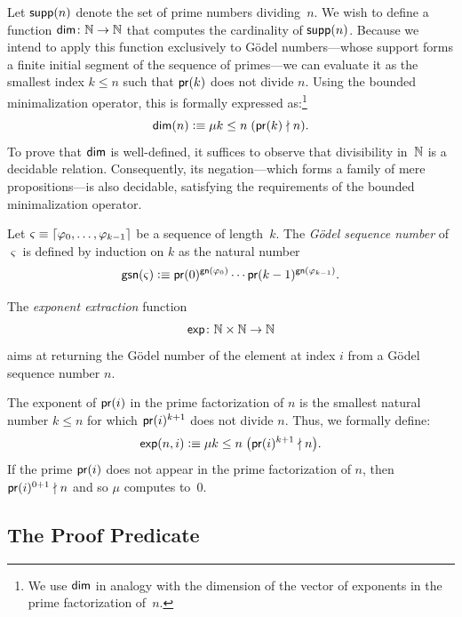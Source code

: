 \begin{defns}
\begin{description}[font=\normalfont\scshape]
        \item[Sequence Dimension:]
        Let $\mathsf{supp}(n)$ denote the set of prime numbers dividing~$n$. We wish to define a function $\fun{dim}\colon\N\to\N$ that computes the cardinality of $\mathsf{supp}(n)$. Because we intend to apply this function exclusively to Gödel numbers---whose support forms a finite initial segment of the sequence of primes---we can evaluate it as the smallest index $k\le n$ such that $\mathsf{pr}(k)$ does not divide $n$. Using the bounded minimalization operator, this is formally expressed as:\footnote{We use $\mathsf{dim}$ in analogy with the dimension of the vector of exponents in the prime factorization of~$n$.}
        \[
            \mathsf{dim}(n)\mathrel{\vcentcolon}\equiv\mu k\le n\;(\mathsf{pr}(k)\nmid n).
        \]
        To prove that $\mathsf{dim}$ is well-defined, it suffices to observe that divisibility in~$\mathbb{N}$ is a decidable relation. Consequently, its negation---which forms a family of mere propositions---is also decidable, satisfying the requirements of the bounded minimalization operator.
        
        \item[Gödel Sequence Number] Let $\varsigma\equiv{\lceil\varphi_0,\dots,\varphi_{k-1}\rceil}$ be a sequence of length~$k$. The \textsl{Gödel sequence number} of $\varsigma$ is defined by induction on $k$ as the natural number
        \[
             \mathsf{gsn}(\varsigma)\mathrel{\vcentcolon}\equiv
                \mathsf{pr}(0)^{\mathsf{gn}(\varphi_0)}
                \cdots
                \mathsf{pr}(k-1)^{\mathsf{gn}(\varphi_{k-1})}.
        \]

        \item[Exponent Extraction] The \textsl{exponent extraction} function
        \[
            \fun{exp}\colon\N\times\N\to\N
        \]
        aims at returning the Gödel number of the element at index $i$ from a Gödel sequence number $n$.

        The exponent of $\mathsf{pr}(i)$ in the prime factorization of $n$ is the smallest natural number $k \le n$ for which $\mathsf{pr}(i)^{k+1}$ does not divide $n$. Thus, we formally define:
        \[
            \mathsf{exp}(n,i)\mathrel{\vcentcolon}\equiv\mu k\le n\;
                \bigl(\mathsf{pr}(i)^{k+1}\nmid n\bigr).
        \]
        If the prime $\mathsf{pr}(i)$ does not appear in the prime factorization of $n$, then $\mathsf{pr}(i)^{0+1}\nmid n$ and so $\mu$ computes to~$0$.
    \end{description}
\end{defns}

\subsection{The Proof Predicate}


